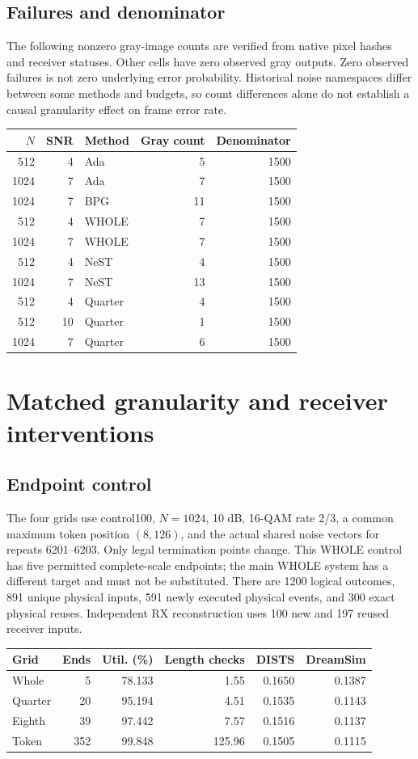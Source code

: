 \documentclass[10pt,letterpaper]{article}
\begin{document}
\subsection{Failures and denominator}
The following nonzero gray-image counts are verified from native pixel hashes and receiver statuses. Other cells have zero observed gray outputs. Zero observed failures is not zero underlying error probability. Historical noise namespaces differ between some methods and budgets, so count differences alone do not establish a causal granularity effect on frame error rate.

\begin{longtable}{@{}rrlrr@{}}\toprule
$N$ & SNR & Method & Gray count & Denominator\\\midrule\endhead
512 & 4 & Ada & 5 & 1500\\
1024 & 7 & Ada & 7 & 1500\\
1024 & 7 & BPG & 11 & 1500\\
512 & 4 & WHOLE & 7 & 1500\\
1024 & 7 & WHOLE & 7 & 1500\\
512 & 4 & NeST & 4 & 1500\\
1024 & 7 & NeST & 13 & 1500\\
512 & 4 & Quarter & 4 & 1500\\
512 & 10 & Quarter & 1 & 1500\\
1024 & 7 & Quarter & 6 & 1500\\
\bottomrule\end{longtable}

\section{Matched granularity and receiver interventions}
\subsection{Endpoint control}
The four grids use control100, $N=1024$, 10 dB, 16-QAM rate 2/3, a common maximum token position $(8,126)$, and the actual shared noise vectors for repeats 6201--6203. Only legal termination points change. This WHOLE control has five permitted complete-scale endpoints; the main WHOLE system has a different target and must not be substituted. There are 1200 logical outcomes, 891 unique physical inputs, 591 newly executed physical events, and 300 exact physical reuses. Independent RX reconstruction uses 100 new and 197 reused receiver inputs.

\begin{longtable}{@{}lrrrrr@{}}\toprule
Grid & Ends & Util. (\%) & Length checks & DISTS & DreamSim\\\midrule\endhead
Whole & 5 & 78.133 & 1.55 & 0.1650 & 0.1387\\
Quarter & 20 & 95.194 & 4.51 & 0.1535 & 0.1143\\
Eighth & 39 & 97.442 & 7.57 & 0.1516 & 0.1137\\
Token & 352 & 99.848 & 125.96 & 0.1505 & 0.1115\\
\bottomrule\end{longtable}
\end{document}
